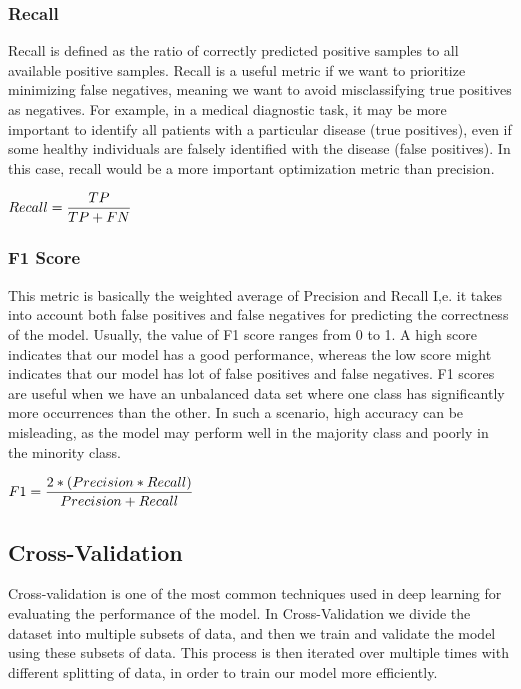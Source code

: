 \documentclass[conference]{IEEEtran}
\begin{document}
\subsubsection{Recall}
Recall is defined as the ratio of correctly predicted positive samples to all available positive samples. Recall is a useful metric if we want to prioritize minimizing false negatives, meaning we want to avoid misclassifying true positives as negatives. For example, in a medical diagnostic task, it may be more important to identify all patients with a particular disease (true positives), even if some healthy individuals are falsely identified with the disease (false positives). In this case, recall would be a more important optimization metric  than precision.

\vspace{10pt}
$Recall = \large\displaystyle\frac{TP}{TP + FN}$
\vspace{10pt}

\vspace{5pt}
\subsubsection{F1 Score}
This metric is basically the weighted average of Precision and Recall I,e. it takes into account both false positives and false negatives for predicting the correctness of the model. Usually, the value of F1 score ranges from 0 to 1. A high score indicates that our model has a good performance, whereas the low score might indicates that our model has lot of false positives and false negatives. F1 scores are useful when we have an unbalanced data set where one class has significantly more occurrences than the other. In such a scenario,  high accuracy can be misleading, as the model may perform well in the majority class and poorly in the minority class. 

\vspace{10pt}
$F1 = \large\displaystyle\frac{2 * (Precision * Recall)}{Precision + Recall} 
$
\vspace{10pt}

\subsection{Cross-Validation}
Cross-validation is one of the most common techniques used in deep learning for evaluating the performance of the model. In Cross-Validation we divide the dataset into multiple subsets of data, and then we train and validate the model using these subsets of data. This process is then iterated over multiple times with different splitting of data, in order to train our model more efficiently.
\end{document}
